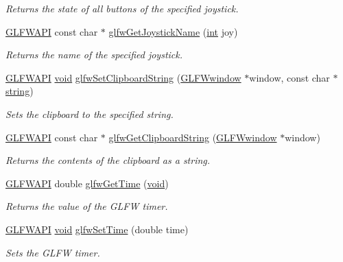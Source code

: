 \begin{DoxyCompactItemize}
\begin{DoxyCompactList}\small\item\em Returns the state of all buttons of the specified joystick. \end{DoxyCompactList}\item 
\hyperlink{glfw3_8h_a56da5036b2cc259351ae22fd6439bb47}{G\+L\+F\+W\+A\+P\+I} const char $\ast$ \hyperlink{group__input_gac50a4fd9b01886cf9fa2c45f19191fb8}{glfw\+Get\+Joystick\+Name} (\hyperlink{wglew_8h_a500a82aecba06f4550f6849b8099ca21}{int} joy)
\begin{DoxyCompactList}\small\item\em Returns the name of the specified joystick. \end{DoxyCompactList}\item 
\hyperlink{glfw3_8h_a56da5036b2cc259351ae22fd6439bb47}{G\+L\+F\+W\+A\+P\+I} \hyperlink{wglew_8h_aeea6e3dfae3acf232096f57d2d57f084}{void} \hyperlink{group__input_ga7a580309bbc185a0459c3559021d2fd7}{glfw\+Set\+Clipboard\+String} (\hyperlink{group__window_ga3c96d80d363e67d13a41b5d1821f3242}{G\+L\+F\+Wwindow} $\ast$window, const char $\ast$\hyperlink{glew_8h_ae84541b4f3d8e1ea24ec0f466a8c568b}{string})
\begin{DoxyCompactList}\small\item\em Sets the clipboard to the specified string. \end{DoxyCompactList}\item 
\hyperlink{glfw3_8h_a56da5036b2cc259351ae22fd6439bb47}{G\+L\+F\+W\+A\+P\+I} const char $\ast$ \hyperlink{group__input_ga3ac90c8bbaf0b46063bb02b574f3b6f7}{glfw\+Get\+Clipboard\+String} (\hyperlink{group__window_ga3c96d80d363e67d13a41b5d1821f3242}{G\+L\+F\+Wwindow} $\ast$window)
\begin{DoxyCompactList}\small\item\em Returns the contents of the clipboard as a string. \end{DoxyCompactList}\item 
\hyperlink{glfw3_8h_a56da5036b2cc259351ae22fd6439bb47}{G\+L\+F\+W\+A\+P\+I} double \hyperlink{group__input_ga03d4a1039b8662c71eeb40beea8cb622}{glfw\+Get\+Time} (\hyperlink{wglew_8h_aeea6e3dfae3acf232096f57d2d57f084}{void})
\begin{DoxyCompactList}\small\item\em Returns the value of the G\+L\+F\+W timer. \end{DoxyCompactList}\item 
\hyperlink{glfw3_8h_a56da5036b2cc259351ae22fd6439bb47}{G\+L\+F\+W\+A\+P\+I} \hyperlink{wglew_8h_aeea6e3dfae3acf232096f57d2d57f084}{void} \hyperlink{group__input_ga94360a3628a09f32708f83cc3fa48590}{glfw\+Set\+Time} (double time)
\begin{DoxyCompactList}\small\item\em Sets the G\+L\+F\+W timer. \end{DoxyCompactList}\end{DoxyCompactItemize}
